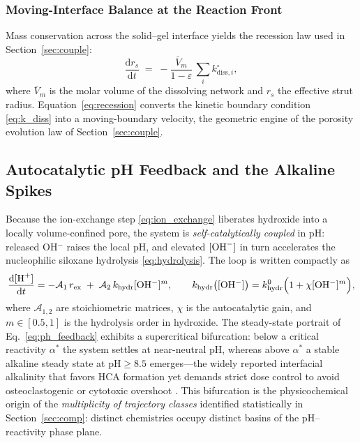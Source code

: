 \documentclass[11pt]{article}
\newcommand{\dd}{\mathrm{d}}
\begin{document}
\subsubsection{Moving-Interface Balance at the Reaction Front}


Mass conservation across the solid--gel interface yields the recession law used in Section~\ref{sec:couple}:
\begin{equation}
\frac{\dd r_s}{\dd t} \;=\; -\frac{\bar{V}_m}{1-\varepsilon}\,\sum_i k_{\mathrm{diss},i}^{\circ},
\label{eq:recession}
\end{equation}
where $\bar{V}_m$ is the molar volume of the dissolving network and $r_s$ the effective strut radius. Equation~\eqref{eq:recession} converts the kinetic boundary condition \eqref{eq:k_diss} into a moving-boundary velocity, the geometric engine of the porosity evolution law of Section~\ref{sec:couple}.


\subsection{Autocatalytic pH Feedback and the Alkaline Spikes}
\label{sec:phfb}


Because the ion-exchange step \eqref{eq:ion_exchange} liberates hydroxide into a locally volume-confined pore, the system is \emph{self-catalytically coupled} in pH: released OH$^{-}$ raises the local pH, and elevated $[\ce{OH-}]$ in turn accelerates the nucleophilic siloxane hydrolysis \eqref{eq:hydrolysis}. The loop is written compactly as
\begin{equation}
\frac{\dd[\ce{H+}]}{\dd t} = -\mathcal{A}_1\,r_{\mathrm{ex}} \;+\; \mathcal{A}_2\,k_{\mathrm{hydr}}[\ce{OH-}]^{m},\qquad
k_{\mathrm{hydr}}\bigl([\ce{OH-}]\bigr)=k_{\mathrm{hydr}}^{0}\Bigl(1+\chi [\ce{OH-}]^{m}\Bigr),
\label{eq:ph_feedback}
\end{equation}
where $\mathcal{A}_{1,2}$ are stoichiometric matrices, $\chi$ is the autocatalytic gain, and $m\in[0.5,1]$ is the hydrolysis order in hydroxide. The steady-state portrait of Eq.~\eqref{eq:ph_feedback} exhibits a supercritical bifurcation: below a critical reactivity $\alpha^{*}$ the system settles at near-neutral pH, whereas above $\alpha^{*}$ a stable alkaline steady state at $\mathrm{pH}\geq8.5$ emerges---the widely reported interfacial alkalinity that favors HCA formation yet demands strict dose control to avoid osteoclastogenic or cytotoxic overshoot \cite{Hench1996,Polo-Montalvo2021}. This bifurcation is the physicochemical origin of the \emph{multiplicity of trajectory classes} identified statistically in Section~\ref{sec:comp}: distinct chemistries occupy distinct basins of the pH--reactivity phase plane.
\end{document}
